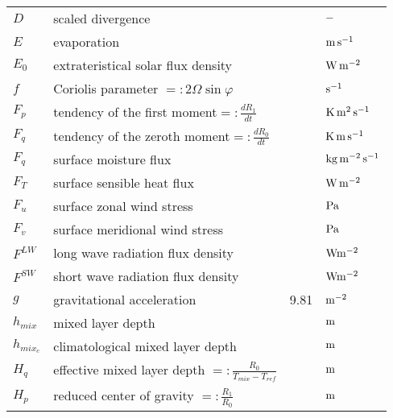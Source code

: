 \begin{tabular*}{\textwidth}{|l@{\extracolsep\fill}lll|}
$D$       & scaled divergence                          &         & $\rm -$ \\

$E$       & evaporation                      &         & $\rm m\,
s^{-1}$ \\
$E_0$          & extrateristical solar flux density         &         & $\rm W\,
m^{-2}$ \\

$f$       & Coriolis parameter $=:2\Omega\sin\varphi$  &         & $\rm
s^{-1}$ \\
$F_p$          & tendency of the first moment$=:\frac{d R_{1}}{d t}$  &    &
$\rm K\, m^2\, s^{-1}$ \\
$F_q$          & tendency of the zeroth moment$=:\frac{d R_{0}}{d t}$ &    &
$\rm K\, m\, s^{-1}$ \\
$F_q$          & surface moisture flux            &         & $\rm kg\,
m^{-2}\, s^{-1}$ \\
$F_T$          & surface sensible heat flux            &         & $\rm W\,
m^{-2}$ \\
$F_u$          & surface zonal wind stress             &         & $\rm Pa$
\\
$F_v$          & surface meridional wind stress        &         & $\rm Pa$
\\
$F^{LW}$  & long wave radiation flux density      &    &$\rm  W m^{-2}$ \\
$F^{SW}$  & short wave radiation flux density     &    &$\rm  W m^{-2}$ \\
$g$       & gravitational acceleration            & 9.81         & $\rm
m^{-2}$ \\

$h_{mix}$      & mixed layer depth                     &         & $\rm m$ \\
$h_{mix_c}$    & climatological mixed layer depth           &         & $\rm m$ \\
$H_q$          & effective mixed layer depth $=:\frac{R_{0}}{T_{mix}-T_{ref}}$ &
& $\rm m$ \\
$H_p$          & reduced center of gravity $=:\frac{R_{1}}{R_0}$ &         &
$\rm m$ \\ 

\hline
\end{tabular*}
\newpage

